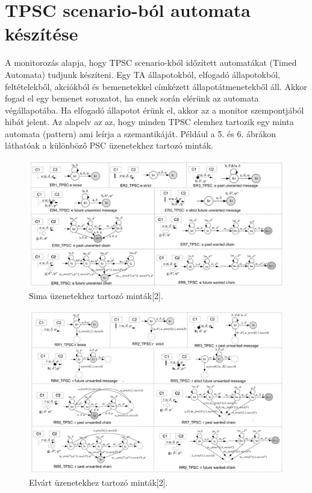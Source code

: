 \chapter{TPSC scenario-ból automata készítése}

A monitorozás alapja, hogy TPSC scenario-kból időzített automatákat (Timed Automata) tudjunk készíteni. Egy TA állapotokból, elfogadó állapotokból, feltételekből, akciókból és bemenetekkel címkézett állapotátmenetekből áll. Akkor fogad el egy bemenet sorozatot, ha ennek során elérünk az automata végállapotába. Ha elfogadó állapotot érünk el, akkor az a monitor szempontjából hibát jelent. Az alapelv az az, hogy minden TPSC elemhez tartozik egy minta automata (pattern) ami leírja a szemantikáját. Például a 5. és 6. ábrákon láthatóak a különböző PSC üzenetekhez tartozó minták.

\begin{figure}[!ht]
    \centering
    \includegraphics[width=150mm, keepaspectratio]{figures/5abra.png}
    \caption{Sima üzenetekhez tartozó minták[2].}
\end{figure}

\begin{figure}[!ht]
    \centering
    \includegraphics[width=150mm, keepaspectratio]{figures/6abra.png}
    \caption{Elvárt üzenetekhez tartozó minták[2].}
\end{figure}

